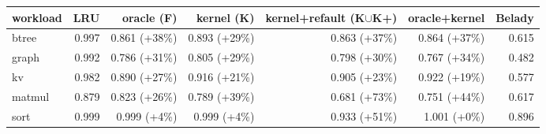 \begin{tabular}{lrrrrrr}
\toprule
workload & LRU & oracle (F) & kernel (K) & kernel{+}refault (K$\cup$K{+}) & oracle{+}kernel & Belady \\
\midrule
btree & 0.997 & 0.861 ({+}38\%) & 0.893 ({+}29\%) & 0.863 ({+}37\%) & 0.864 ({+}37\%) & 0.615 \\
graph & 0.992 & 0.786 ({+}31\%) & 0.805 ({+}29\%) & 0.798 ({+}30\%) & 0.767 ({+}34\%) & 0.482 \\
kv & 0.982 & 0.890 ({+}27\%) & 0.916 ({+}21\%) & 0.905 ({+}23\%) & 0.922 ({+}19\%) & 0.577 \\
matmul & 0.879 & 0.823 ({+}26\%) & 0.789 ({+}39\%) & 0.681 ({+}73\%) & 0.751 ({+}44\%) & 0.617 \\
sort & 0.999 & 0.999 ({+}4\%) & 0.999 ({+}4\%) & 0.933 ({+}51\%) & 1.001 ({+}0\%) & 0.896 \\
\bottomrule
\end{tabular}
